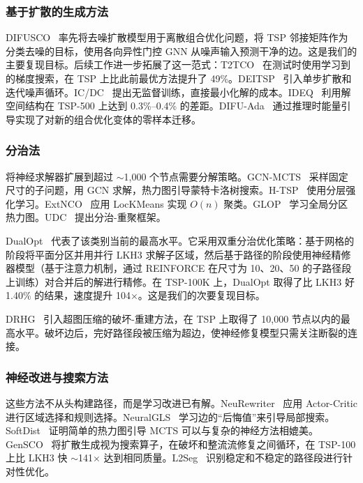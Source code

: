 \documentclass[11pt,a4paper]{ctexart}
\begin{document}
\subsubsection{基于扩散的生成方法}

DIFUSCO~\cite{sun2023} 率先将去噪扩散模型用于离散组合优化问题，将 TSP 邻接矩阵作为分类去噪的目标，使用各向异性门控 GNN 从噪声输入预测干净的边。这是我们的主要复现目标。后续工作进一步拓展了这一范式：T2TCO~\cite{li2024t2t} 在测试时使用学习到的梯度搜索，在 TSP 上比此前最优方法提升了 49\%。DEITSP~\cite{zhou2025deitsp} 引入单步扩散和迭代噪声循环。IC/DC~\cite{huang2025} 提出无监督训练，直接最小化解的成本。IDEQ~\cite{basson2025} 利用解空间结构在 TSP-500 上达到 0.3\%--0.4\% 的差距。DIFU-Ada~\cite{lei2025} 通过推理时能量引导实现了对新的组合优化变体的零样本迁移。

\subsubsection{分治法}

将神经求解器扩展到超过 $\sim$1,000 个节点需要分解策略。GCN-MCTS~\cite{fu2021} 采样固定尺寸的子问题，用 GCN 求解，热力图引导蒙特卡洛树搜索。H-TSP~\cite{pan2023} 使用分层强化学习。ExtNCO~\cite{chen2023} 应用 LocKMeans 实现 $O(n)$ 聚类。GLOP~\cite{ye2024} 学习全局分区热力图。UDC~\cite{zheng2024} 提出分治-重聚框架。

DualOpt~\cite{zhou2025} 代表了该类别当前的最高水平。它采用双重分治优化策略：基于网格的阶段将平面分区并用并行 LKH3 求解子区域，然后基于路径的阶段使用神经精修器模型（基于注意力机制，通过 REINFORCE 在尺寸为 10、20、50 的子路径段上训练）对合并后的解进行精修。在 TSP-100K 上，DualOpt 取得了比 LKH3 好 1.40\% 的结果，速度提升 104$\times$。这是我们的次要复现目标。

DRHG~\cite{li2025drhg} 引入超图压缩的破坏-重建方法，在 TSP 上取得了 10,000 节点以内的最高水平。破坏边后，完好路径段被压缩为超边，使神经修复模型只需关注断裂的连接。

\subsubsection{神经改进与搜索方法}

这些方法不从头构建路径，而是学习改进已有解。NeuRewriter~\cite{chen2019} 应用 Actor-Critic 进行区域选择和规则选择。NeuralGLS~\cite{neuralgls2024} 学习边的``后悔值''来引导局部搜索。SoftDist~\cite{xia2024softdist} 证明简单的热力图引导 MCTS 可以与复杂的神经方法相媲美。GenSCO~\cite{gensco2025} 将扩散生成视为搜索算子，在破坏和整流流修复之间循环，在 TSP-100 上比 LKH3 快 $\sim$141$\times$ 达到相同质量。L2Seg~\cite{xue2024} 识别稳定和不稳定的路径段进行针对性优化。
\end{document}
